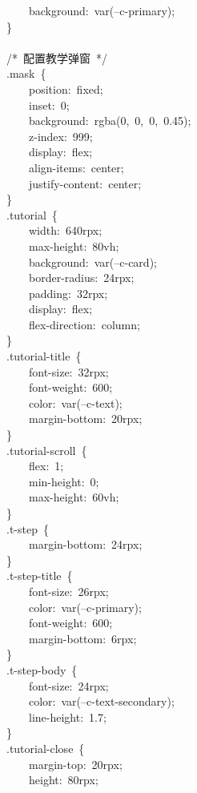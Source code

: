 \documentclass[a4paper,10pt]{article}
\begin{document}
\newpage

{\ttfamily\footnotesize\raggedright
~~~~~~~~background:~var(--c-primary);\\
~~~~\}\\
\mbox{}\\
~~~~/*~配置教学弹窗~*/\\
~~~~.mask~\{\\
~~~~~~~~position:~fixed;\\
~~~~~~~~inset:~0;\\
~~~~~~~~background:~rgba(0,~0,~0,~0.45);\\
~~~~~~~~z-index:~999;\\
~~~~~~~~display:~flex;\\
~~~~~~~~align-items:~center;\\
~~~~~~~~justify-content:~center;\\
~~~~\}\\
~~~~.tutorial~\{\\
~~~~~~~~width:~640rpx;\\
~~~~~~~~max-height:~80vh;\\
~~~~~~~~background:~var(--c-card);\\
~~~~~~~~border-radius:~24rpx;\\
~~~~~~~~padding:~32rpx;\\
~~~~~~~~display:~flex;\\
~~~~~~~~flex-direction:~column;\\
~~~~\}\\
~~~~.tutorial-title~\{\\
~~~~~~~~font-size:~32rpx;\\
~~~~~~~~font-weight:~600;\\
~~~~~~~~color:~var(--c-text);\\
~~~~~~~~margin-bottom:~20rpx;\\
~~~~\}\\
~~~~.tutorial-scroll~\{\\
~~~~~~~~flex:~1;\\
~~~~~~~~min-height:~0;\\
~~~~~~~~max-height:~60vh;\\
~~~~\}\\
~~~~.t-step~\{\\
~~~~~~~~margin-bottom:~24rpx;\\
~~~~\}\\
~~~~.t-step-title~\{\\
~~~~~~~~font-size:~26rpx;\\
~~~~~~~~color:~var(--c-primary);\\
~~~~~~~~font-weight:~600;\\
~~~~~~~~margin-bottom:~6rpx;\\
~~~~\}\\
~~~~.t-step-body~\{\\
~~~~~~~~font-size:~24rpx;\\
~~~~~~~~color:~var(--c-text-secondary);\\
~~~~~~~~line-height:~1.7;\\
~~~~\}\\
~~~~.tutorial-close~\{\\
~~~~~~~~margin-top:~20rpx;\\
~~~~~~~~height:~80rpx;
}
\end{document}
